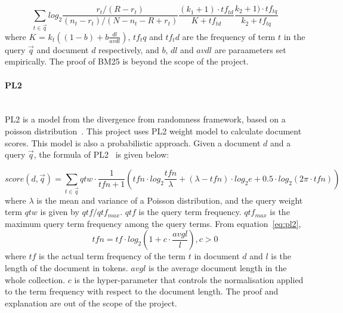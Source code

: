 \begin{equation}\label{eq:BM25}
\sum_{t \in \vec{q}} log_2 \frac{r_t/(R - r_t)}{(n_t - r_t)/(N - n_t - R + r_t)} \frac{(k_1 + 1)\cdot tf_{td}}{K + tf_{td}} \frac{k_2 + 1)\cdot tf_{tq}}{k_2 + tf_{tq}}
\end{equation}
where $K$ = $k_t((1 - b) + b\frac{dl}{avdl})$, $tf_tq$ and $tf_td$ are the frequency of term $t$ in the query $\vec{q}$ and document $d$ respectively,
and $b$, $dl$ and $avdl$ are paraameters set empirically. The proof of BM25 is beyond the scope of the project.

\paragraph{PL2} \hspace{0pt} \\
PL2 is a model from the divergence from randomness framework, based on a poisson distribution~\cite{craig}. This project uses PL2 weight model to 
calculate document scores. This model is also a probabilistic approach. Given a document $d$ and a query $\vec{q}$, the formula of PL2~\cite[P. 23-24]{craigthesis} is given below:

\begin{equation}\label{eq:pl2}
 score(d, \vec{q}) = \sum_{t \in \vec{q}} qtw\cdot \frac{1}{tfn + 1}(tfn\cdot log_2\frac{tfn}{\lambda} + 
 (\lambda - tfn)\cdot log_2e + 0.5\cdot log_2(2\pi \cdot tfn))
\end{equation}
where $\lambda$ is the mean and variance of a Poisson distribution, and the query weight term $qtw$ is given by $qtf/qtf_{max}$.
$qtf$ is the query term frequency. $qtf_{max}$ is the maximum query term frequency among the query terms. From equation~\ref{eq:pl2}, 
\[tfn = tf\cdot log_2(1 + c\cdot \frac{avgl}{l}), c > 0\]
where $tf$ is the actual term frequency of the term $t$ in document $d$ and $l$ is the length of the
document in tokens. $avgl$ is the average document length in the whole collection.
$c$ is the hyper-parameter that controls the normalisation applied to the term frequency
with respect to the document length.
The proof and explanation are out of the scope of the project.


